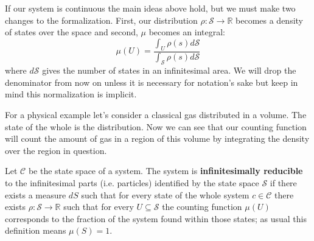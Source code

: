\documentclass{article}
\begin{document}
	
	
	If our system is continuous the main ideas above hold, but we must make two changes to the formalization. First, our distribution $\rho : \mathcal{S} \to \mathbb{R}$ becomes a density of states over the space and second, $\mu$ becomes an integral: $$\mu(U) = \frac{\int_{U} \rho(s) d\mathcal{S}}{\int_{\mathcal{S}} \rho(s) d\mathcal{S}}$$ where $d\mathcal{S}$ gives the number of states in an infinitesimal area. We will drop the denominator from now on unless it is necessary for notation's sake but keep in mind this normalization is implicit.
	
	 For a physical example let's consider a classical gas distributed in a volume. The state of the whole is the distribution. Now we can see that our counting function will count the amount of gas in a region of this volume by integrating the density over the region in question.
	
	
\begin{defn}
	Let $\mathcal{C}$ be the state space of a system. The system is \textbf{infinitesimally reducible} to the infinitesimal parts (i.e. particles) identified by the state space $\mathcal{S}$ if there exists a measure $dS$ such that for every state of the whole system $c \in \mathcal{C}$ there exists $\rho : \mathcal{S} \to \mathbb{R}$ such that for every $U \subseteq \mathcal{S}$ the counting function $\mu(U)$ corresponds to the fraction of the system found within those states; as usual this definition means $\mu(S) = 1$.
\end{defn}	
	
\end{document}
